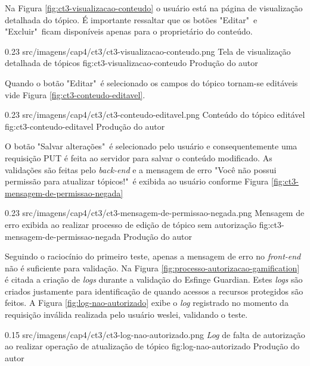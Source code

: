 \par Na Figura \ref{fig:ct3-visualizacao-conteudo} o usuário está na página de visualização detalhada do tópico. É importante ressaltar que os botões "Editar"\ e "Excluir"\ ficam disponíveis apenas para o proprietário do conteúdo. 

\begin{image}
{0.23}
{src/imagens/cap4/ct3/ct3-visualizacao-conteudo.png}
{Tela de visualização detalhada de tópicos}
{fig:ct3-visualizacao-conteudo}
{Produção do autor}
\end{image}

\par Quando o botão "Editar"\ é selecionado os campos do tópico tornam-se editáveis vide Figura \ref{fig:ct3-conteudo-editavel}.

\begin{image}
{0.23}
{src/imagens/cap4/ct3/ct3-conteudo-editavel.png}
{Conteúdo do tópico editável}
{fig:ct3-conteudo-editavel}
{Produção do autor}
\end{image}

\par O botão "Salvar alterações"\ é selecionado pelo usuário e consequentemente uma requisição PUT é feita ao servidor para salvar o conteúdo modificado. As validações são feitas pelo \textit{back-end} e a mensagem de erro "Você não possui permissão para atualizar tópicos!"\ é exibida ao usuário conforme Figura \ref{fig:ct3-mensagem-de-permissao-negada}

\begin{image}
{0.23}
{src/imagens/cap4/ct3/ct3-mensagem-de-permissao-negada.png}
{Mensagem de erro exibida ao realizar processo de edição de tópico sem autorização}
{fig:ct3-mensagem-de-permissao-negada}
{Produção do autor}
\end{image}

\par Seguindo o raciocínio do primeiro teste, apenas a mensagem de erro no \textit{front-end} não é suficiente para validação. Na Figura \ref{fig:processo-autorizacao-gamification} é citada a criação de \textit{logs} durante a validação do Esfinge Guardian. Estes \textit{logs} são criados justamente para identificação de quando acessos a recursos protegidos são feitos. A Figura \ref{fig:log-nao-autorizado} exibe o \textit{log} registrado no momento da requisição inválida realizada pelo usuário weslei, validando o teste.

\begin{image}
{0.15}
{src/imagens/cap4/ct3/ct3-log-nao-autorizado.png}
{\textit{Log} de falta de autorização ao realizar operação de atualização de tópico}
{fig:log-nao-autorizado}
{Produção do autor}
\end{image}

